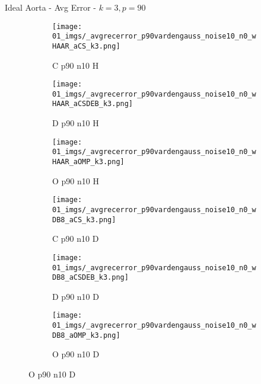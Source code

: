 \begin{frame}{Ideal Aorta - Avg Error - $k=3,p=90$}{}
\begin{figure}
\begin{subfigure}{0.13\textwidth}
\texttt{[image: 01\_imgs/\_avgrecerror\_p90vardengauss\_noise10\_n0\_wHAAR\_aCS\_k3.png]}
\caption*{\tiny C p90 n10 H}
\end{subfigure}
\begin{subfigure}{0.13\textwidth}
\texttt{[image: 01\_imgs/\_avgrecerror\_p90vardengauss\_noise10\_n0\_wHAAR\_aCSDEB\_k3.png]}
\caption*{\tiny D p90 n10 H}
\end{subfigure}
\begin{subfigure}{0.13\textwidth}
\texttt{[image: 01\_imgs/\_avgrecerror\_p90vardengauss\_noise10\_n0\_wHAAR\_aOMP\_k3.png]}
\caption*{\tiny O p90 n10 H}
\end{subfigure}
\begin{subfigure}{0.13\textwidth}
\texttt{[image: 01\_imgs/\_avgrecerror\_p90vardengauss\_noise10\_n0\_wDB8\_aCS\_k3.png]}
\caption*{\tiny C p90 n10 D}
\end{subfigure}
\begin{subfigure}{0.13\textwidth}
\texttt{[image: 01\_imgs/\_avgrecerror\_p90vardengauss\_noise10\_n0\_wDB8\_aCSDEB\_k3.png]}
\caption*{\tiny D p90 n10 D}
\end{subfigure}
\begin{subfigure}{0.13\textwidth}
\texttt{[image: 01\_imgs/\_avgrecerror\_p90vardengauss\_noise10\_n0\_wDB8\_aOMP\_k3.png]}
\caption*{\tiny O p90 n10 D}
\end{subfigure}

\vspace{5pt}


\end{figure}
\end{frame}
